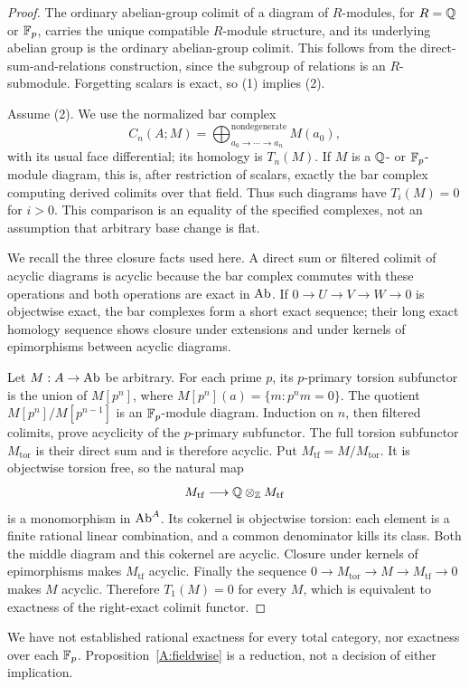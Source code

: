 \begin{proof}
The ordinary abelian-group colimit of a diagram of $R$-modules, for
$R=\mathbb Q$ or $\mathbb F_p$, carries the unique compatible $R$-module structure,
and its underlying abelian group is the ordinary abelian-group colimit.
This follows from the direct-sum-and-relations construction, since the
subgroup of relations is an $R$-submodule. Forgetting scalars is exact,
so (1) implies (2).

Assume (2). We use the normalized bar complex
\[
 C_n(A;M)=\bigoplus_{a_0\to\cdots\to a_n}^{\mathrm{nondegenerate}}
 M(a_0),
\]
with its usual face differential; its homology is $T_n(M)$. If $M$ is
a $\mathbb Q$- or $\mathbb F_p$-module diagram, this is, after restriction of scalars,
exactly the bar complex computing derived colimits over that field.
Thus such diagrams have $T_i(M)=0$ for $i>0$. This comparison is an
equality of the specified complexes, not an assumption that arbitrary
base change is flat.

We recall the three closure facts used here. A direct sum or filtered
colimit of acyclic diagrams is acyclic because the bar complex commutes
with these operations and both operations are exact in $\mathrm{Ab}$. If
$0\to U\to V\to W\to0$ is objectwise exact, the bar complexes form a
short exact sequence; their long exact homology sequence shows closure
under extensions and under kernels of epimorphisms between acyclic
diagrams.

Let $M:A\to\mathrm{Ab}$ be arbitrary. For each prime $p$, its $p$-primary
torsion subfunctor is the union of $M[p^n]$, where
$M[p^n](a)=\{m:p^nm=0\}$. The quotient
$M[p^n]/M[p^{n-1}]$ is an $\mathbb F_p$-module diagram. Induction on $n$,
then filtered colimits, prove acyclicity of the $p$-primary subfunctor.
The full torsion subfunctor $M_{\mathrm{tor}}$ is their direct sum and
is therefore acyclic. Put $M_{\mathrm{tf}}=M/M_{\mathrm{tor}}$.
It is objectwise torsion free, so the natural map
\[
 M_{\mathrm{tf}}\longrightarrow\mathbb Q\otimes_\mathbb Z M_{\mathrm{tf}}
\]
is a monomorphism in $\mathrm{Ab}^A$. Its cokernel is objectwise torsion:
each element is a finite rational linear combination, and a common
denominator kills its class. Both the middle diagram and this cokernel
are acyclic. Closure under kernels of epimorphisms makes
$M_{\mathrm{tf}}$ acyclic. Finally the sequence
$0\to M_{\mathrm{tor}}\to M\to M_{\mathrm{tf}}\to0$ makes $M$
acyclic. Therefore $T_1(M)=0$ for every $M$, which is equivalent to
exactness of the right-exact colimit functor.
\end{proof}

\begin{obstruction}\label{A:coefficients}
We have not established rational exactness for every total category, nor
exactness over each $\mathbb F_p$. Proposition~\ref{A:fieldwise} is a reduction,
not a decision of either implication.
\end{obstruction}

